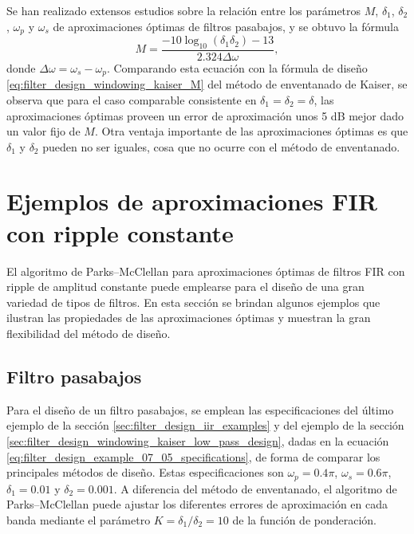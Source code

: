 \documentclass[a4paper]{report}
\begin{document}
Se han realizado extensos estudios sobre la relación entre los parámetros \(M\), \(\delta_1\), \(\delta_2\), \(\omega_p\) y \(\omega_s\) de aproximaciones óptimas de filtros pasabajos, y se obtuvo la fórmula
\begin{equation}\label{eq:filter_design_fir_pm_M_estimation}
 M=\frac{-10\log_{10}(\delta_1\delta_2)-13}{2.324\Delta\omega},
\end{equation}
donde \(\Delta\omega=\omega_s-\omega_p\). Comparando esta ecuación con la fórmula de diseño  \ref{eq:filter_design_windowing_kaiser_M} del método de enventanado de Kaiser, se observa que para el caso comparable consistente en \(\delta_1=\delta_2=\delta\), las aproximaciones óptimas proveen un error de aproximación unos 5 dB mejor dado un valor fijo de \(M\). Otra ventaja importante de las aproximaciones óptimas es que \(\delta_1\) y \(\delta_2\) pueden no ser iguales, cosa que no ocurre con el método de enventanado.

\section{Ejemplos de aproximaciones FIR con ripple constante}

El algoritmo de Parks--McClellan para aproximaciones óptimas de filtros FIR con ripple de amplitud constante puede emplearse para el diseño de una gran variedad de tipos de filtros. En esta sección se brindan algunos ejemplos que ilustran las propiedades de las aproximaciones óptimas y muestran la gran flexibilidad del método de diseño.

\subsection{Filtro pasabajos}\label{sec:filter_design_fir_pm_low_pass_design}

Para el diseño de un filtro pasabajos, se emplean las especificaciones del último ejemplo de la sección \ref{sec:filter_design_iir_examples} y del ejemplo de la sección \ref{sec:filter_design_windowing_kaiser_low_pass_design}, dadas en la ecuación \ref{eq:filter_design_example_07_05_specifications}, de forma de comparar los principales métodos de diseño. Estas especificaciones son \(\omega_p=0.4\pi\), \(\omega_s=0.6\pi\), \(\delta_1=0.01\) y \(\delta_2=0.001\). A diferencia del método de enventanado, el algoritmo de Parks--McClellan puede ajustar los diferentes errores de aproximación en cada banda mediante el parámetro \(K=\delta_1/\delta_2=10\) de la función de ponderación.
\end{document}
